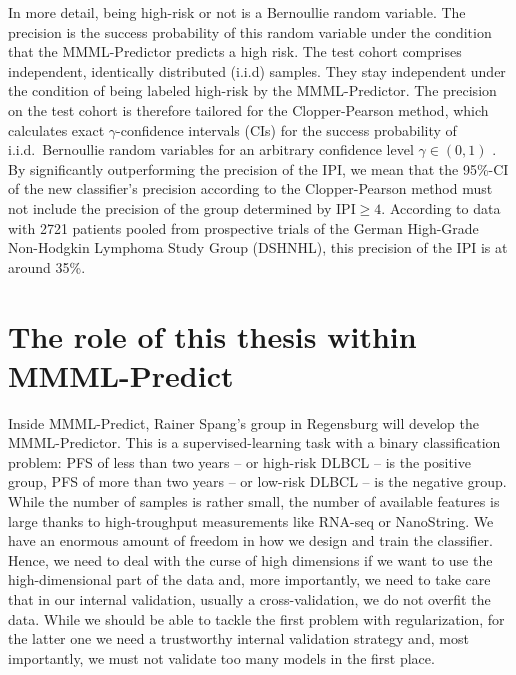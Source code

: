 In more detail, being high-risk or not is a Bernoullie random variable. 
The precision is the success probability of this random variable under the condition that the 
MMML-Predictor predicts a high risk. The test cohort comprises independent, identically distributed 
(i.i.d) samples. They stay independent under the condition of being labeled high-risk by the 
MMML-Predictor. The precision on the test cohort is therefore tailored for the Clopper-Pearson 
method, which calculates exact $\gamma$-confidence intervals (CIs) for the success probability 
of i.i.d.\ Bernoullie random variables for an arbitrary confidence level $\gamma \in (0, 1)$
\cite{clopper34}.
By significantly outperforming the precision of the IPI, we mean that the \num{95}\%-CI
of the new classifier's precision according to the Clopper-Pearson method must not include the 
precision of the group determined by $\text{IPI} \geq 4$. According to data with \num{2721} 
patients pooled from prospective trials of the German High-Grade Non-Hodgkin Lymphoma Study Group 
(DSHNHL), this precision of the IPI is at around \num{35}\%. 

\section{The role of this thesis within MMML-Predict}

Inside MMML-Predict, Rainer Spang's group in Regensburg will develop the MMML-Predictor. 
This is 
a supervised-learning task with a binary classification problem: PFS of less 
than two years -- or high-risk DLBCL -- is the positive group, PFS of more than two 
years -- or low-risk DLBCL -- is the negative group. While the number of samples is rather small, 
the number of available features is large thanks to high-troughput measurements like RNA-seq or 
NanoString. We have an enormous amount of freedom in how we design and train the classifier. 
Hence, we need to deal with the curse of high dimensions if we want to use the high-dimensional part 
of the data and, 
more importantly, we need to take care that in our internal validation, usually a cross-validation,
we do not overfit the data. While we should be able to tackle the first problem with regularization,
for the latter one we need a trustworthy internal validation strategy and, most importantly, we 
must not validate too many models in the first place.

